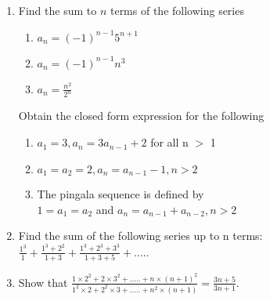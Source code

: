 \begin{enumerate}[label=\thesubsection.\arabic*,ref=\thesubsection.\theenumi]
%
\item Find the sum to $n$ terms of the following series
\begin{enumerate}
\item $a_n = (-1)^{n-1}5^{n+1}$
\item $a_n = (-1)^{n-1}n^3$
\item $a_n = \frac{n^2}{2^n}$
\end{enumerate}
Obtain the closed form expression for the following
\begin{enumerate}
\item $a_1 = 3, a_n = 3a_{n-1}+2$ for all n $>$ 1
\item $a_1 = a_2 = 2, a_n = a_{n-1}-1,n > 2$ 
\item The pingala sequence is defined by \\$1 = a_1 = a_2$ and $a_n = a_{n-1}+a_{n-2},n>2 $
\end{enumerate}
\item Find the sum of the following series up to n terms:
$\frac{1^3}{1}+\frac{1^3+2^2}{1+3}+\frac{1^3+2^3+3^3}{1+3+5}+.....$
\item Show that $\frac{1 \times 2^2+ 2 \times 3^2+.....+n \times (n+1)^2}{1^2 \times 2 + 2^2 \times 3 +.....+n^2 \times (n+1)} = \frac{3n+5}{3n+1}.$
\end{enumerate}
